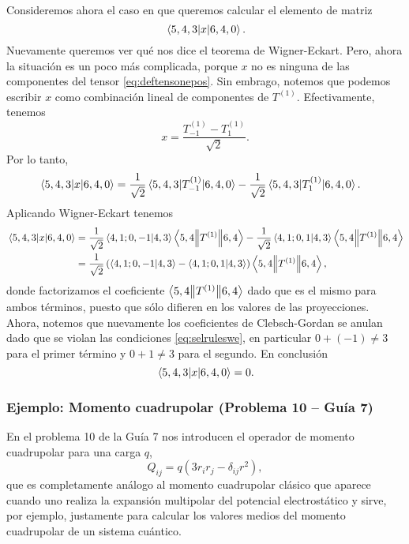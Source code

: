 \documentclass[10pt, a4paper]{article}
\numberwithin{equation}{subsection}
\begin{document}
Consideremos ahora el caso en que queremos calcular el elemento de matriz
\begin{equation}
  \matrixel{5,4,3}{x}{6,4,0}.
\end{equation}
Nuevamente queremos ver qué nos dice el teorema de Wigner-Eckart. Pero, ahora
la situación es un poco más complicada, porque $x$ no es ninguna de las componentes
del tensor \eqref{eq:deftensonepos}. Sin embrago, notemos que podemos escribir
$x$ como combinación lineal de componentes de $T^{(1)}$. Efectivamente,
tenemos
\begin{equation}
  x = \frac{T^{(1)}_{-1} - T^{(1)}_{1}}{\sqrt{2}}.
\end{equation}
Por lo tanto,
\begin{align}
  \matrixel{5,4,3}{x}{6,4,0} &=
  \frac{1}{\sqrt{2}}\matrixel{5,4,3}{T^{(1)}_{-1}}{6,4,0} -
  \frac{1}{\sqrt{2}}\matrixel{5,4,3}{T^{(1)}_{1}}{6,4,0}.
\end{align}
Aplicando Wigner-Eckart tenemos
\begin{align}
  \matrixel{5,4,3}{x}{6,4,0} &=
    \frac{1}{\sqrt{2}}\braket{4,1;0,-1}{4,3} \doublebarmel{5,4}{T^{(1)}}{6,4} -
    \frac{1}{\sqrt{2}}\braket{4,1;0,1}{4,3} \doublebarmel{5,4}{T^{(1)}}{6,4}
    \nonumber \\
  &=  \frac{1}{\sqrt{2}}\left(\braket{4,1;0,-1}{4,3} -
    \braket{4,1;0,1}{4,3}\right) \doublebarmel{5,4}{T^{(1)}}{6,4},
\end{align}
donde factorizamos el coeficiente $\left\langle{5,4}\middle\|{T^{(1)}}\middle\|{6,4}\right\rangle$ dado que
es el mismo para ambos términos, puesto que sólo difieren en los valores de las
proyecciones. Ahora, notemos que nuevamente los coeficientes de Clebsch-Gordan
se anulan dado que se violan las condiciones \eqref{eq:selruleswe}, en
particular $0 + (-1) \neq 3$ para el primer término y $0 + 1 \neq 3$ para el
segundo. En conclusión
\begin{equation}
  \matrixel{5,4,3}{x}{6,4,0} = 0.
\end{equation}

\subsubsection{Ejemplo: Momento cuadrupolar (Problema 10 -- Guía 7)}

En el problema 10 de la Guía 7 nos introducen el operador de momento
cuadrupolar para una carga $q$,
\begin{equation}
  Q_{ij} = q\left(3r_ir_j - \delta_{ij}r^2\right),
\end{equation}
que es completamente análogo al momento cuadrupolar clásico que aparece cuando
uno realiza la expansión multipolar del potencial electrostático y sirve, por
ejemplo, justamente para calcular los valores medios del momento cuadrupolar de
un sistema cuántico.
\end{document}
